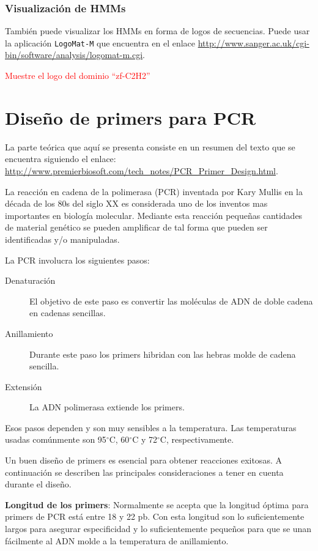 \documentclass[letter,11pt]{book}
\begin{document}
\subsection{Visualización de HMMs}

También puede visualizar los HMMs en forma de logos de secuencias. Puede usar la aplicación \Verb+LogoMat-M+ que encuentra en el enlace \url{http://www.sanger.ac.uk/cgi-bin/software/analysis/logomat-m.cgi}.

\textcolor{red}{Muestre el logo del dominio ``zf-C2H2''}

\chapter{Diseño de primers para PCR}

La parte teórica que aquí se presenta consiste en un resumen del texto que se encuentra siguiendo el enlace: \url{http://www.premierbiosoft.com/tech_notes/PCR_Primer_Design.html}.

La reacción en cadena de la polimerasa (PCR) inventada por Kary Mullis en la década de los 80s del siglo XX \citep{Mullis1987} es considerada uno de los inventos mas importantes en biología molecular. Mediante esta reacción pequeñas cantidades de material genético se pueden amplificar de tal forma que pueden ser identificadas y/o manipuladas.

La PCR involucra los siguientes pasos:

\begin{description}
\item[Denaturación] El objetivo de este paso es convertir las moléculas de ADN de doble cadena en cadenas sencillas.
\item[Anillamiento] Durante este paso los primers hibridan con las hebras molde de cadena sencilla.
\item[Extensión] La ADN polimerasa extiende los primers.
\end{description}

Esos pasos dependen y son muy sensibles a la temperatura. Las temperaturas usadas comúnmente son 95$^\circ$C, 60$^\circ$C y 72$^\circ$C, respectivamente.

Un buen diseño de primers es esencial para obtener reacciones exitosas. A continuación se describen las principales consideraciones a tener en cuenta durante el diseño.

\textbf{Longitud de los primers}: Normalmente se acepta que la longitud óptima para primers de PCR está entre 18 y 22 pb. Con esta longitud son lo suficientemente largos para asegurar especificidad y lo suficientemente pequeños para que se unan fácilmente al ADN molde a la temperatura de anillamiento.
\end{document}
